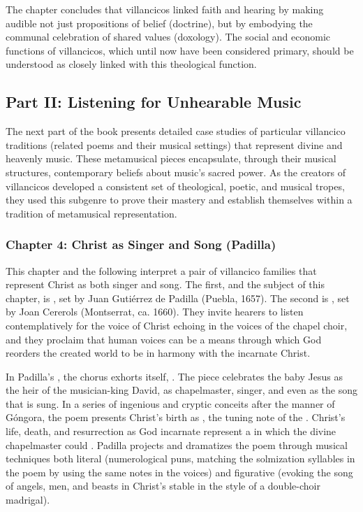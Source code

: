 \documentclass{vcbook-proposal}
\begin{document}
The chapter concludes that villancicos linked faith and hearing by making audible not just propositions of belief (doctrine), but by embodying the communal celebration of shared values (doxology).
The social and economic functions of villancicos, which until now have been considered primary, should be understood as closely linked with this theological function.

\subsection{Part II: Listening for Unhearable Music}

The next part of the book presents detailed case studies of particular villancico traditions (related poems and their musical settings) that represent divine and heavenly music.
These metamusical pieces encapsulate, through their musical structures, contemporary beliefs about music's sacred power.
As the creators of villancicos developed a consistent set of theological, poetic, and musical tropes, they used this subgenre to prove their mastery and establish themselves within a tradition of metamusical representation.

\subsubsection{Chapter 4: Christ as Singer and Song (Padilla)}

This chapter and the following interpret a pair of villancico families that represent Christ as both singer and song.
The first, and the subject of this chapter, is , set by Juan Gutiérrez de Padilla (Puebla, 1657).
The second is , set by Joan Cererols (Montserrat, ca. 1660).
They invite hearers to listen contemplatively for the voice of Christ echoing in the voices of the chapel choir, and they proclaim that human voices can be a means through which God reorders the created world to be in harmony with the incarnate Christ.

In Padilla's , the chorus exhorts itself, .
The piece celebrates the baby Jesus as the heir of the musician-king David, as chapelmaster, singer, and even as the song that is sung.
In a series of ingenious and cryptic conceits after the manner of Góngora, the poem presents Christ's birth as , the tuning note of the .
Christ's life, death, and resurrection as God incarnate represent a  in which the divine chapelmaster could .
Padilla projects and dramatizes the poem through musical techniques both literal (numerological puns, matching the solmization syllables in the poem by using the same notes in the voices) and figurative (evoking the song of angels, men, and beasts in Christ's stable in the style of a double-choir madrigal).
\end{document}
